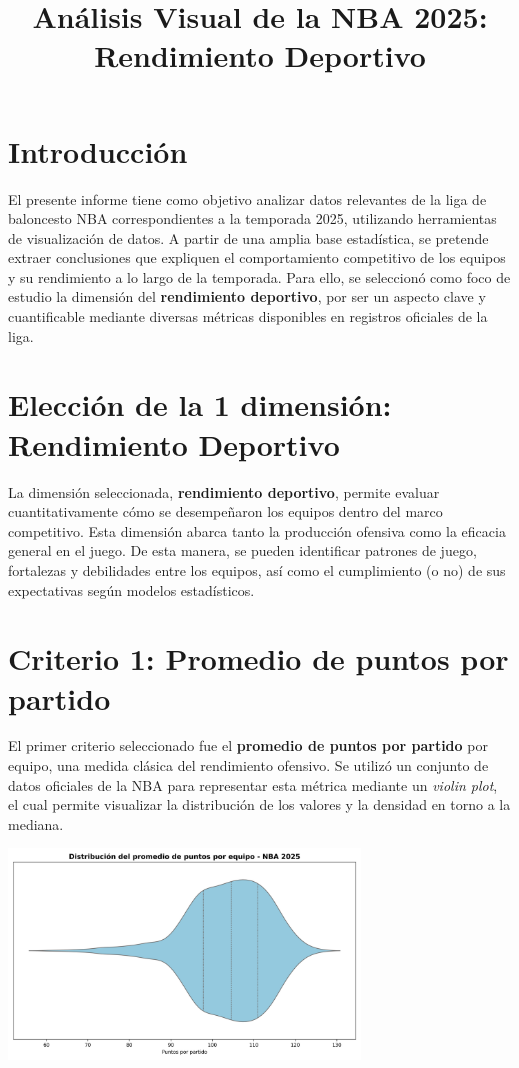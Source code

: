 \documentclass[12pt]{article}
\title{An\'alisis Visual de la NBA 2025: Rendimiento Deportivo}
\author{}
\date{}
\begin{document}
\maketitle

\section*{Introducci\'on}

El presente informe tiene como objetivo analizar datos relevantes de la liga de baloncesto NBA correspondientes a la temporada 2025, utilizando herramientas de visualizaci\'on de datos. A partir de una amplia base estad\'istica, se pretende extraer conclusiones que expliquen el comportamiento competitivo de los equipos y su rendimiento a lo largo de la temporada. Para ello, se seleccion\'o como foco de estudio la dimensi\'on del \textbf{rendimiento deportivo}, por ser un aspecto clave y cuantificable mediante diversas m\'etricas disponibles en registros oficiales de la liga.

\section*{Elecci\'on de la 1 dimensi\'on: Rendimiento Deportivo}

La dimensi\'on seleccionada, \textbf{rendimiento deportivo}, permite evaluar cuantitativamente c\'omo se desempe\~naron los equipos dentro del marco competitivo. Esta dimensi\'on abarca tanto la producci\'on ofensiva como la eficacia general en el juego. De esta manera, se pueden identificar patrones de juego, fortalezas y debilidades entre los equipos, as\'i como el cumplimiento (o no) de sus expectativas seg\'un modelos estad\'isticos.

\section*{Criterio 1: Promedio de puntos por partido}

El primer criterio seleccionado fue el \textbf{promedio de puntos por partido} por equipo, una medida cl\'asica del rendimiento ofensivo. Se utiliz\'o un conjunto de datos oficiales de la NBA para representar esta m\'etrica mediante un \textit{violin plot}, el cual permite visualizar la distribuci\'on de los valores y la densidad en torno a la mediana. 

\begin{center}
    \includegraphics[width=0.7\textwidth]{violinplot_pts_per_game_nba2025.png}
\end{center}
\end{document}
